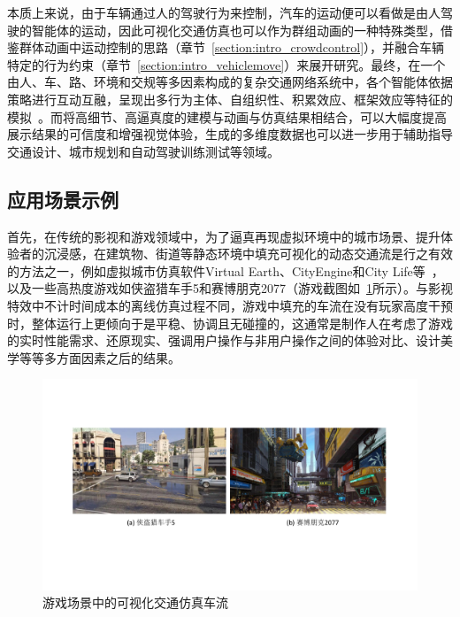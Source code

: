 本质上来说，由于车辆通过人的驾驶行为来控制，汽车的运动便可以看做是由人驾驶的智能体的运动，因此可视化交通仿真也可以作为群组动画的一种特殊类型，借鉴群体动画中运动控制的思路（章节~\ref{section:intro_crowdcontrol}），并融合车辆特定的行为约束（章节~\ref{section:intro_vehiclemove}）来展开研究。最终，在一个由人、车、路、环境和交规等多因素构成的复杂交通网络系统中，各个智能体依据策略进行互动互融，呈现出多行为主体、自组织性、积累效应、框架效应等特征的模拟~\cite{brockmann2006scaling, barabasi1999emergence, dianhai2001traffic}。而将高细节、高逼真度的建模与动画与仿真结果相结合，可以大幅度提高展示结果的可信度和增强视觉体验，生成的多维度数据也可以进一步用于辅助指导交通设计、城市规划和自动驾驶训练测试等领域。


\subsection{应用场景示例}
\label{section:intro_apply}

首先，在传统的影视和游戏领域中，为了逼真再现虚拟环境中的城市场景、提升体验者的沉浸感，在建筑物、街道等静态环境中填充可视化的动态交通流是行之有效的方法之一，例如虚拟城市仿真软件Virtual Earth、CityEngine和City Life等~\cite{wang2017survey}，以及一些高热度游戏如侠盗猎车手5和赛博朋克2077（游戏截图如~\ref{fig:intro_games}所示）。与影视特效中不计时间成本的离线仿真过程不同，游戏中填充的车流在没有玩家高度干预时，整体运行上更倾向于是平稳、协调且无碰撞的，这通常是制作人在考虑了游戏的实时性能需求、还原现实、强调用户操作与非用户操作之间的体验对比、设计美学等等多方面因素之后的结果。

\begin{figure}[!tbh]
\centering
\includegraphics[width=\textwidth]{figure/intro/games.pdf}
\caption[游戏场景中的可视化交通仿真车流]{
游戏场景中的可视化交通仿真车流
}
\label{fig:intro_games}
\end{figure}

